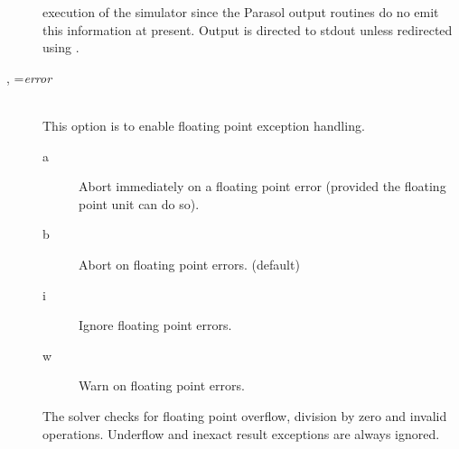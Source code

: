 \begin{description}
  execution of the simulator since the Parasol output routines do no
  emit this information at present.  Output is directed to stdout
  unless redirected using .
\item[\flag{e}, \longopt{error}=\emph{error}]~\\
  This option is to enable floating point
  exception handling.
  \begin{description}
  \item[a] Abort immediately on a floating point error (provided the
    floating point unit can do so).
  \item[b] Abort on floating point errors. (default)
  \item[i] Ignore floating point errors.
  \item[w] Warn on floating point errors.
  \end{description}
  The solver checks for floating point overflow,
  division by zero and invalid operations.  Underflow and inexact
  result exceptions are always ignored.
  

\end{description}
